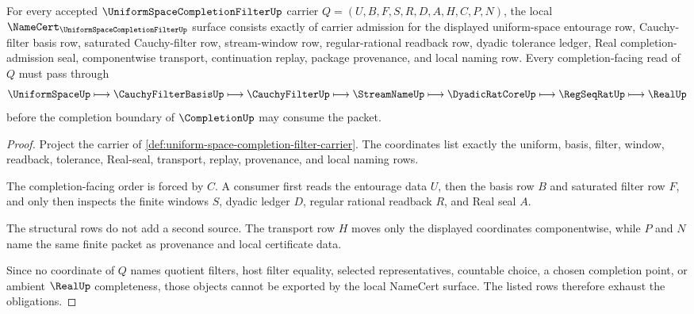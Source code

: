 \begin{theorem}
\label{thm:uniform-space-completion-filter-namecert-obligations}
For every accepted $\UniformSpaceCompletionFilterUp$ carrier $Q=(U,B,F,S,R,D,A,H,C,P,N)$, the local $\NameCert_{\UniformSpaceCompletionFilterUp}$ surface consists exactly of carrier admission for the displayed uniform-space entourage row, Cauchy-filter basis row, saturated Cauchy-filter row, stream-window row, regular-rational readback row, dyadic tolerance ledger, Real completion-admission seal, componentwise transport, continuation replay, package provenance, and local naming row. Every completion-facing read of $Q$ must pass through
$$
\UniformSpaceUp \longmapsto \CauchyFilterBasisUp \longmapsto \CauchyFilterUp \longmapsto \StreamNameUp \longmapsto \DyadicRatCoreUp \longmapsto \RegSeqRatUp \longmapsto \RealUp
$$
before the completion boundary of $\CompletionUp$ may consume the packet.
\end{theorem}
\begin{proof}
Project the carrier of \autoref{def:uniform-space-completion-filter-carrier}. The coordinates list exactly the uniform, basis, filter, window, readback, tolerance, Real-seal, transport, replay, provenance, and local naming rows.

The completion-facing order is forced by $C$. A consumer first reads the entourage data $U$, then the basis row $B$ and saturated filter row $F$, and only then inspects the finite windows $S$, dyadic ledger $D$, regular rational readback $R$, and Real seal $A$.

The structural rows do not add a second source. The transport row $H$ moves only the displayed coordinates componentwise, while $P$ and $N$ name the same finite packet as provenance and local certificate data.

Since no coordinate of $Q$ names quotient filters, host filter equality, selected representatives, countable choice, a chosen completion point, or ambient $\RealUp$ completeness, those objects cannot be exported by the local NameCert surface. The listed rows therefore exhaust the obligations.
\end{proof}

